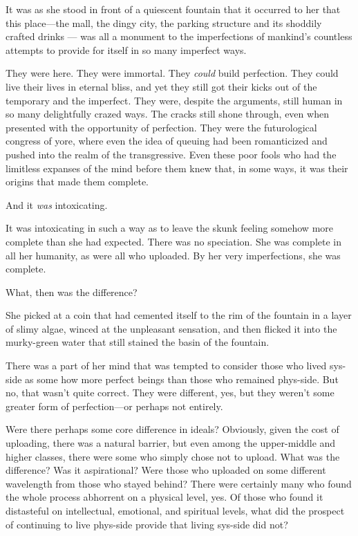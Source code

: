 It was as she stood in front of a quiescent fountain that it occurred to her that this place---the mall, the dingy city, the parking structure and its shoddily crafted drinks — was all a monument to the imperfections of mankind's countless attempts to provide for itself in so many imperfect ways.

They were here. They were immortal. They \emph{could} build perfection. They could live their lives in eternal bliss, and yet they still got their kicks out of the temporary and the imperfect. They were, despite the arguments, still human in so many delightfully crazed ways. The cracks still shone through, even when presented with the opportunity of perfection. They were the futurological congress of yore, where even the idea of queuing had been romanticized and pushed into the realm of the transgressive. Even these poor fools who had the limitless expanses of the mind before them knew that, in some ways, it was their origins that made them complete.

And it \emph{was} intoxicating.

It was intoxicating in such a way as to leave the skunk feeling somehow more complete than she had expected. There was no speciation. She was complete in all her humanity, as were all who uploaded. By her very imperfections, she was complete.

What, then was the difference?

She picked at a coin that had cemented itself to the rim of the fountain in a layer of slimy algae, winced at the unpleasant sensation, and then flicked it into the murky-green water that still stained the basin of the fountain.

There was a part of her mind that was tempted to consider those who lived sys-side as some how more perfect beings than those who remained phys-side. But no, that wasn't quite correct. They were different, yes, but they weren't some greater form of perfection---or perhaps not entirely.

Were there perhaps some core difference in ideals? Obviously, given the cost of uploading, there was a natural barrier, but even among the upper-middle and higher classes, there were some who simply chose not to upload. What was the difference? Was it aspirational? Were those who uploaded on some different wavelength from those who stayed behind? There were certainly many who found the whole process abhorrent on a physical level, yes. Of those who found it distasteful on intellectual, emotional, and spiritual levels, what did the prospect of continuing to live phys-side provide that living sys-side did not?

